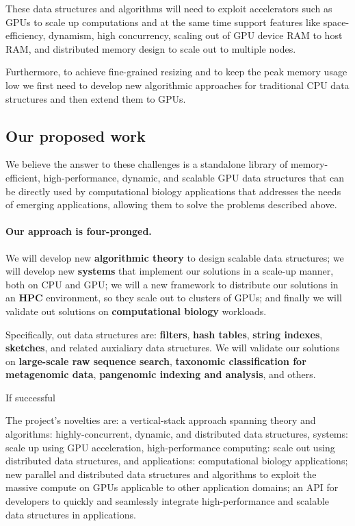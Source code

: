 These data structures and algorithms will need to exploit accelerators such as GPUs to scale up computations and at the same time support  features like space-efficiency, dynamism, high concurrency, scaling out of GPU device RAM to host RAM, and distributed memory design to scale out to multiple nodes.

Furthermore, to achieve fine-grained resizing and to keep the peak memory usage low we first need to develop new algorithmic approaches for traditional CPU data structures and then extend them to GPUs.

\subsection{Our proposed work}

We believe the answer to these challenges is a standalone library of memory-efficient, high-performance, dynamic, and scalable GPU data structures that can be directly used by computational biology applications that addresses the needs of emerging applications, allowing them to solve the problems described above.

\paragraph{Our approach is four-pronged.}  We will develop new \textbf{algorithmic theory} to design scalable data structures; we will develop new \textbf{systems} that implement our solutions in a scale-up manner,  both on CPU and GPU; we will a new framework to distribute our solutions in an \textbf{HPC} environment, so they  scale out to clusters of GPUs; and finally we will validate out solutions on \textbf{computational biology} workloads.

Specifically, out data structures are: \textbf{filters}, \textbf{hash tables}, \textbf{string indexes}, \textbf{sketches}, and related auxialiary data structures.  We will validate our solutions on \textbf{large-scale raw sequence search}, \textbf{taxonomic classification for metagenomic data}, \textbf{pangenomic indexing and analysis}, and others.

If successful 

The project’s novelties are: a vertical-stack approach spanning theory and algorithms: highly-concurrent, dynamic, and distributed data structures, systems: scale up using GPU acceleration, high-performance computing: scale out using distributed data structures, and applications: computational biology applications; new parallel and distributed data structures and algorithms to exploit the massive compute on GPUs applicable to other application domains; an API for developers to quickly and seamlessly integrate high-performance and scalable data structures in applications.

